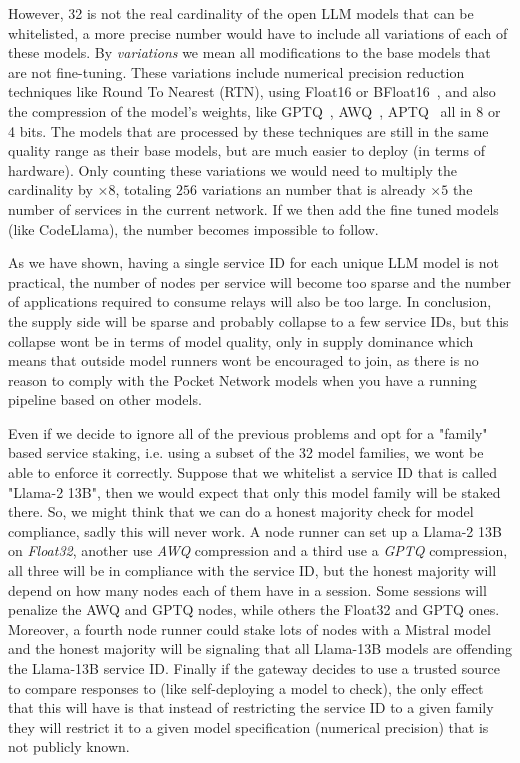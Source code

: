 However, 32 is not the real cardinality of the open LLM models that can be whitelisted, a more precise number would have to include all variations of each of these models. By \emph{variations} we mean all modifications to the base models that are not fine-tuning. These variations include numerical precision reduction techniques like Round To Nearest (RTN), using Float16 or BFloat16~\cite{kalamkar2019study}, and also the compression of the model's weights, like  GPTQ~\cite{frantar2022gptq}, AWQ~\cite{lin2023awq}, APTQ~\cite{guan2024aptq} all in 8 or 4 bits. The models that are processed by these techniques are still in the same quality range as their base models, but are much easier to deploy (in terms of hardware). Only counting these variations we would need to multiply the cardinality by $\times8$, totaling $256$ variations an number that is already $\times5$ the number of services in the current network.
If we then add the fine tuned models (like CodeLlama), the number becomes impossible to follow.

As we have shown, having a single service ID for each unique LLM model is not practical, the number of nodes per service will become too sparse and the number of applications required to consume relays will also be too large. In conclusion, the supply side will be sparse and probably collapse to a few service IDs, but this collapse wont be in terms of model quality, only in supply dominance which means that outside model runners wont be encouraged to join, as there is no reason to comply with the Pocket Network models when you have a running pipeline based on other models.

Even if we decide to ignore all of the previous problems and opt for a "family" based service staking, i.e. using a subset of the 32 model families, we wont be able to enforce it correctly. Suppose that we whitelist a service ID that is called "Llama-2 13B", then we would expect that only this model family will be staked there. So, we might think that we can do a honest majority check for model compliance, sadly this will never work. A node runner can set up a Llama-2 13B on \emph{Float32}, another use \emph{AWQ} compression and a third use a \emph{GPTQ} compression, all three will be in compliance with the service ID, but the honest majority will depend on how many nodes each of them have in a session. Some sessions will penalize the AWQ and GPTQ nodes, while others the Float32 and GPTQ ones. Moreover, a fourth node runner could stake lots of nodes with a Mistral model and the honest majority will be signaling that all Llama-13B models are offending the Llama-13B service ID. Finally if the gateway decides to use a trusted source to compare responses to (like self-deploying a model to check), the only effect that this will have is that instead of restricting the service ID to a given family they will restrict it to a given model specification (numerical precision) that is not publicly known.

